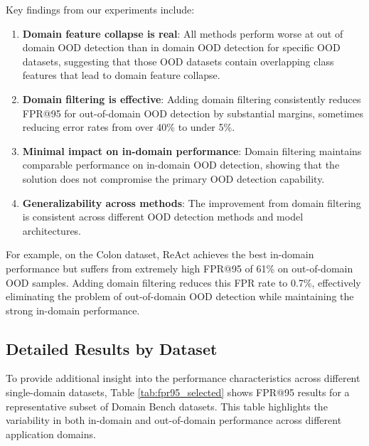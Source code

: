 \documentclass[11pt, oneside]{book}
\theoremstyle{plain}
\theoremstyle{definition}
\theoremstyle{remark}
\begin{document}
Key findings from our experiments include:

\begin{enumerate}
\item \textbf{Domain feature collapse is real}: All methods perform worse at out of domain OOD detection than in domain OOD detection for specific OOD datasets, suggesting that those OOD datasets contain overlapping class features that lead to domain feature collapse.

\item \textbf{Domain filtering is effective}: Adding domain filtering consistently reduces FPR@95 for out-of-domain OOD detection by substantial margins, sometimes reducing error rates from over 40\% to under 5\%.

\item \textbf{Minimal impact on in-domain performance}: Domain filtering maintains comparable performance on in-domain OOD detection, showing that the solution does not compromise the primary OOD detection capability.

\item \textbf{Generalizability across methods}: The improvement from domain filtering is consistent across different OOD detection methods and model architectures.
\end{enumerate}

For example, on the Colon dataset, ReAct achieves the best in-domain performance but suffers from extremely high FPR@95 of 61\% on out-of-domain OOD samples. Adding domain filtering reduces this FPR rate to 0.7\%, effectively eliminating the problem of out-of-domain OOD detection while maintaining the strong in-domain performance.

\subsection{Detailed Results by Dataset}

To provide additional insight into the performance characteristics across different single-domain datasets, Table \ref{tab:fpr95_selected} shows FPR@95 results for a representative subset of Domain Bench datasets. This table highlights the variability in both in-domain and out-of-domain performance across different application domains.
\end{document}
